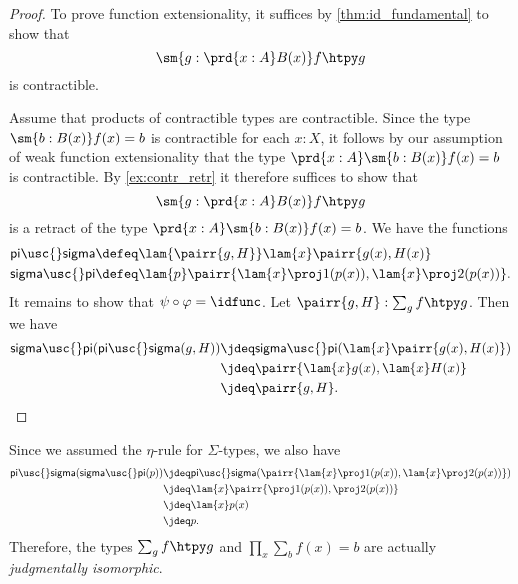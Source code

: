 \begin{proof}
To prove function extensionality, it suffices by \autoref{thm:id_fundamental} to show that
\begin{equation*}
\sm{g:\prd{x:A}B(x)}f\htpy g
\end{equation*}
is contractible.

Assume that products of contractible types are contractible.
Since the type $\sm{b:B(x)}f(x)=b$ is contractible for each $x:X$, it follows by our assumption of weak function extensionality that the type $\prd{x:A}\sm{b:B(x)}f(x)=b$ is contractible. By \autoref{ex:contr_retr} it therefore suffices to show that
\begin{equation*}
\sm{g:\prd{x:A}B(x)}f\htpy g
\end{equation*}
is a retract of the type $\prd{x:A}\sm{b:B(x)}f(x)=b$. We have the functions
\begin{align*}
\mathsf{pi\usc{}sigma} & \defeq \lam{\pairr{g,H}}\lam{x}\pairr{g(x),H(x)} \\
\mathsf{sigma\usc{}pi} & \defeq \lam{p}\pairr{\lam{x}\proj 1(p(x)),\lam{x}\proj 2(p(x))}.
\end{align*}
It remains to show that $\psi\circ\varphi=\idfunc$. Let $\pairr{g,H}:\sum_g f\htpy g$. 
Then we have
\begin{align*}
\mathsf{sigma\usc{}pi}(\mathsf{pi\usc{}sigma}(g,H)) & \jdeq \mathsf{sigma\usc{}pi}(\lam{x}\pairr{g(x),H(x)}) \\
& \jdeq \pairr{\lam{x}g(x),\lam{x}H(x)} \\
& \jdeq \pairr{g,H}.\qedhere
\end{align*}
\end{proof}

\begin{rmk}
Since we assumed the $\eta$-rule for $\Sigma$-types, we also have
\begin{align*}
\mathsf{pi\usc{}sigma}(\mathsf{sigma\usc{}pi}(p)) & \jdeq \mathsf{pi\usc{}sigma}(\pairr{\lam{x}\proj 1(p(x)),\lam{x}\proj 2(p(x))}) \\
& \jdeq \lam{x}\pairr{\proj 1(p(x)),\proj 2(p(x))} \\
& \jdeq \lam{x} p(x) \\
& \jdeq p.
\end{align*}
Therefore, the types $\sum_g f\htpy g$ and $\prod_x\sum_b f(x)=b$ are actually \emph{judgmentally isomorphic}. 
\end{rmk}

